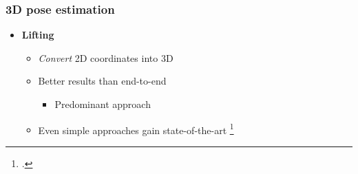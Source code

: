 \documentclass[9pt]{beamer}
\providecommand{\fcite}[1]{\footcite{#1}}
\newenvironment{myframe}[1][]{%
\begin{frame}%
\frametitle{#1}
\setcounter{footnote}{0}


}{%
\end{frame}%
}
\begin{document}
\begin{myframe}[3D pose estimation]
    \begin{itemize}
        \item \textbf{Lifting}
        \begin{itemize}
            \item \textit{Convert} 2D coordinates into 3D
			\item Better results than end-to-end
			\begin{itemize}
				\item Predominant approach
			\end{itemize}
			\item Even simple approaches gain state-of-the-art \fcite{martinez_simple_2017}
        \end{itemize}
    \end{itemize}
\end{myframe}

\end{document}
